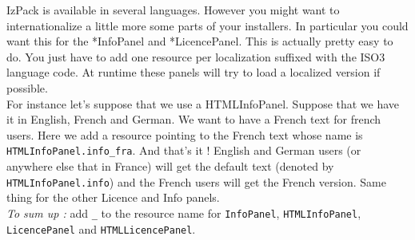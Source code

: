 IzPack is available in several languages. However you might want to
internationalize a little more some parts of your installers. In particular you
could want this for the *InfoPanel and *LicencePanel. This is actually pretty
easy to do. You just have to add one resource per localization suffixed with the
ISO3 language code. At runtime these panels will try to load a localized version
if possible.\\

For instance let's suppose that we use a HTMLInfoPanel. Suppose that we have it
in English, French and German. We want to have a French text for french users.
Here we add a resource pointing to the French text whose name is
\texttt{HTMLInfoPanel.info\_fra}. And that's it ! English and German users (or
anywhere else that in France) will get the default text (denoted by 
\texttt{HTMLInfoPanel.info}) and the French users will get the French version.
Same thing for the other Licence and Info panels.\\

\noindent
\textit{To sum up :} add \texttt{\_<iso3 code>} to the resource name for
\texttt{InfoPanel}, \texttt{HTMLInfoPanel}, \texttt{LicencePanel} and
\texttt{HTMLLicencePanel}.\\
